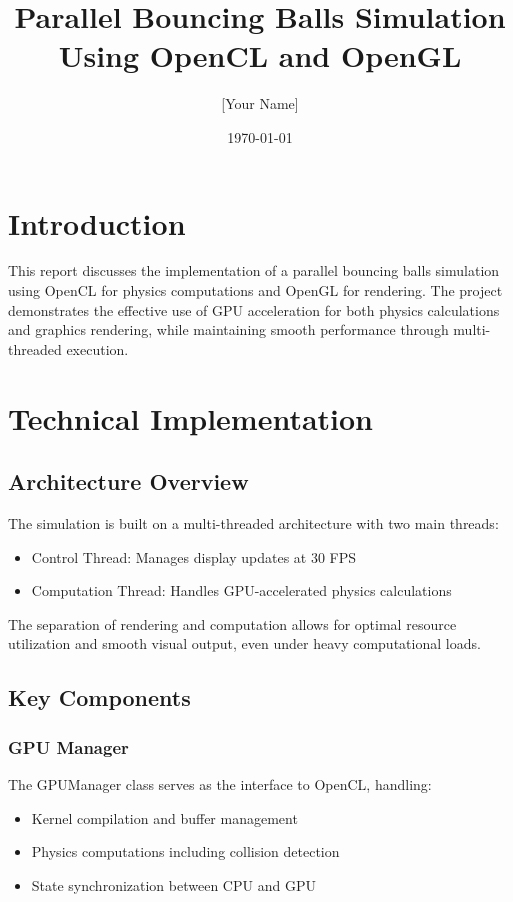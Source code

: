 \documentclass[12pt]{article}
\title{Parallel Bouncing Balls Simulation Using OpenCL and OpenGL}
\author{[Your Name]}
\date{\today}
\begin{document}
\maketitle

\section{Introduction}
This report discusses the implementation of a parallel bouncing balls simulation using OpenCL for physics computations and OpenGL for rendering. The project demonstrates the effective use of GPU acceleration for both physics calculations and graphics rendering, while maintaining smooth performance through multi-threaded execution.

\section{Technical Implementation}

\subsection{Architecture Overview}
The simulation is built on a multi-threaded architecture with two main threads:
\begin{itemize}
    \item Control Thread: Manages display updates at 30 FPS
    \item Computation Thread: Handles GPU-accelerated physics calculations
\end{itemize}

The separation of rendering and computation allows for optimal resource utilization and smooth visual output, even under heavy computational loads.

\subsection{Key Components}
\subsubsection{GPU Manager}
The GPUManager class serves as the interface to OpenCL, handling:
\begin{itemize}
    \item Kernel compilation and buffer management
    \item Physics computations including collision detection
    \item State synchronization between CPU and GPU
\end{itemize}
\end{document}
